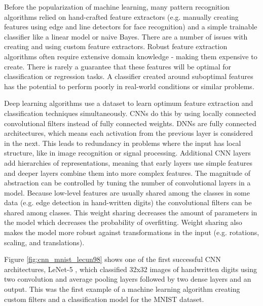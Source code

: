 Before the popularization of machine learning, many pattern recognition algorithms relied on hand-crafted feature extractors (e.g. manually creating features using edge and line detectors for face recognition) and a simple trainable classifier like a linear model or naive Bayes. There are a number of issues with creating and using custom feature extractors. Robust feature extraction algorithms often require extensive domain knowledge - making them expensive to create. There is rarely a guarantee that these features will be optimal for classification or regression tasks. A classifier created around suboptimal features has the potential to perform poorly in real-world conditions or similar problems.

Deep learning algorithms use a dataset to learn optimum feature extraction and classification techniques simultaneously. CNNs do this by using locally connected convolutional filters instead of fully connected weights. DNNs are fully connected architectures, which means each activation from the previous layer is considered in the next. This leads to redundancy in problems where the input has local structure, like in image recognition or signal processing. Additional CNN layers add hierarchies of representations, meaning that early layers use simple features and deeper layers combine them into more complex features. The magnitude of abstraction can be controlled by tuning the number of convolutional layers in a model. Because low-level features are usually shared among the classes in some data (e.g. edge detection in hand-written digits) the convolutional filters can be shared among classes. This weight sharing decreases the amount of parameters in the model which decreases the probability of overfitting. Weight sharing also makes the model more robust against transformations in the input (e.g. rotations, scaling, and translations).

Figure \ref{fig:cnn_mnist_lecun98} shows one of the first successful CNN architectures, LeNet-5 \cite{Lecun1998}, which classified 32x32 images of handwritten digits using two convolution and average pooling layers followed by two dense layers and an output. This was the first example of a machine learning algorithm creating custom filters and a classification model for the MNIST dataset.



